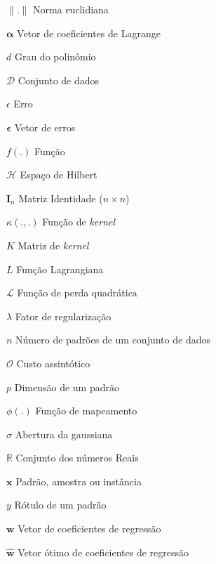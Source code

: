 \begin{simbolos}
    \item[$\lVert.\rVert$] Norma euclidiana
    \item[$\boldsymbol{\alpha}$] Vetor de coeficientes de Lagrange
    \item[$d$] Grau do polinômio
    \item[$\mathcal{D}$] Conjunto de dados
    \item[$\epsilon$] Erro
    \item[$\boldsymbol{\epsilon}$] Vetor de erros
    \item[$f(.)$] Função
    \item[$\mathcal{H}$] Espaço de Hilbert
    \item[$\mathbf{I}_n$] Matriz Identidade ($n \times n$)
    \item[$\kappa(.,.)$] Função de \textit{kernel}
    \item[$K$] Matriz de \textit{kernel}
    \item[$L$] Função Lagrangiana
    \item[$\mathcal{L}$] Função de perda quadrática
    \item[$\lambda$] Fator de regularização
    \item[$n$] Número de padrões de um conjunto de dados
    \item[$\mathcal{O}$] Custo assintótico
    \item[$p$] Dimensão de um padrão
    \item[$\phi(.)$] Função de mapeamento
    \item[$\sigma$] Abertura da gaussiana
    \item[$\mathbb{R}$] Conjunto dos números Reais
    \item[$\mathbf{x}$] Padrão, amostra ou instância
    \item[$y$] Rótulo de um padrão
    \item[$\mathbf{w}$] Vetor de coeficientes de regressão
    \item[$\mathbf{\hat{w}}$] Vetor ótimo de coeficientes de regressão
\end{simbolos}